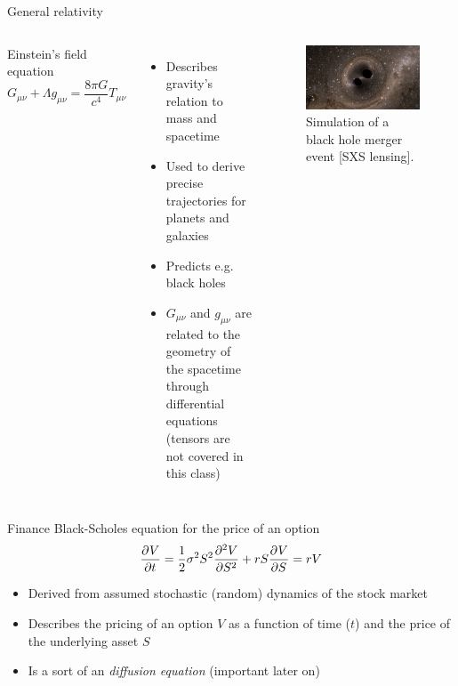 \begin{frame}{General relativity}
	\begin{columns}[T,onlytextwidth]
		Einstein's field equation
		$$
		G_{\mu \nu} + \Lambda g_{\mu \nu} = \frac{8 \pi G}{c^4} T_{\mu \nu}
		$$
		\begin{itemize}
			\item Describes gravity's relation to mass and spacetime 
			\item Used to derive precise trajectories for planets and galaxies
			\item Predicts e.g. black holes
			\item $ G_{\mu \nu} $ and $ g_{\mu \nu} $ are related to the geometry of the spacetime through differential equations (tensors are not covered in this class)
		\end{itemize}
		
		
		\vspace{2em}
		\begin{figure}
			\includegraphics[width=\linewidth]{merger}
			\caption{Simulation of a black hole merger event [SXS lensing].}
		\end{figure}
	\end{columns}
\end{frame}


\begin{frame}{Finance}
		Black-Scholes equation for the price of an option
		$$
		\pfrac{V}{t} = \frac{1}{2}\sigma^2 S^2 \pfrac[2]{V}{S} + r S \pfrac{V}{S} = rV
		$$
		\begin{itemize}
			\item Derived from assumed stochastic (random) dynamics of the stock market
			\item Describes the pricing of an option $ V $ as a function of time ($ t $) and the price of the underlying asset $ S $
			\item Is a sort of an \emph{diffusion equation} (important later on)
		\end{itemize}
\end{frame}

